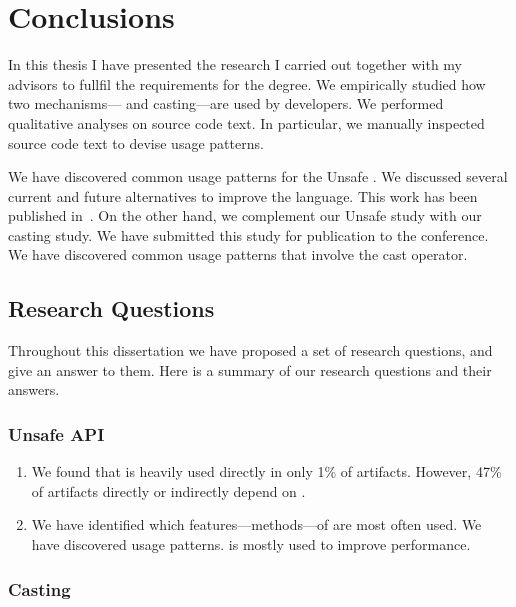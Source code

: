 \chapter{Conclusions}
\label{cha:conclusions}

In this thesis I have presented the research I carried out together with my advisors to fullfil the requirements for the \phd{} degree.
We empirically studied how two mechanisms---\unsafe{} \api{} and casting---are used by \java{} developers.
We performed qualitative analyses on source code text.
In particular, we manually inspected source code text to devise usage patterns.

We have discovered common usage patterns for the \java{} Unsafe \api{}.
We discussed several current and future alternatives to improve the
\java{} language.
This work has been published in~\citep{mastrangeloUseYourOwn2015}.
On the other hand, we complement our Unsafe \api{} study with 
our casting study.
We have submitted this study for publication to the  conference.
We have discovered common usage patterns that involve the cast operator.

\section{Research Questions}

Throughout this dissertation we have proposed a set of research questions,
and give an answer to them.
Here is a summary of our research questions and their answers.

\subsection*{Unsafe API}

\begin{enumerate}[label=\ref{unsafe:rq\arabic*},leftmargin=3.4\parindent]
\item {\bf \urqA} 
We found that \smu{} is heavily used directly in only 1\% of artifacts.
However, 47\% of artifacts directly or indirectly depend on \smu{}.
\item {\bf \urqB} 
We have identified which features---methods---of \smu{} are most often used.
We have discovered \unsafe{} usage patterns.
\smu{} is mostly used to improve performance.
\end{enumerate}

\subsection*{Casting}

